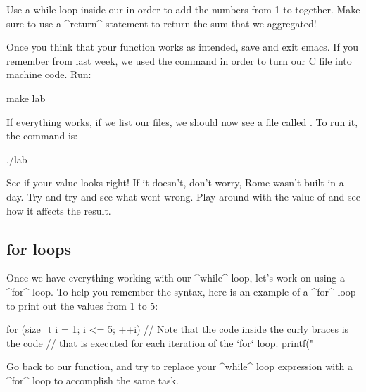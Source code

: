 \documentclass{tufte-handout}
\begin{document}
\noindent
Use a while loop inside our  in order to
add the numbers from 1 to  together. Make sure to
use a ^return^ statement to return the sum that we aggregated!

Once you think that your function works as intended, save and exit
emacs. If you remember from last week, we used the 
command in order to turn our C file into machine code. Run:

\begin{CmdLine*}
  \C make lab\\
\end{CmdLine*}

\noindent
If everything works, if we list our files, we should now see a file
called . To run it, the command is:

\begin{CmdLine*}
  \C ./lab\\
\end{CmdLine*}

\noindent
See if your value looks right!  If it doesn't, don't worry, Rome wasn't
built in a day.  Try and try and see what went wrong.  Play around with the value of  and see
how it affects the result.

\subsection{{\codestyleKeyword for} loops}

Once we have everything working with our ^while^ loop, let's work on
using a ^for^ loop.  To help you remember the syntax, here is an example
of a ^for^ loop to print out the values from 1 to 5:

\begin{Code}
    for (size_t i = 1; i <= 5; ++i) {
        // Note that the code inside the curly braces is the code
        // that is executed for each iteration of the `for` loop.
        printf("%
    }
\end{Code}

Go back to our  function, and try to replace
your ^while^ loop expression with a ^for^ loop to accomplish the same task.
\end{document}
